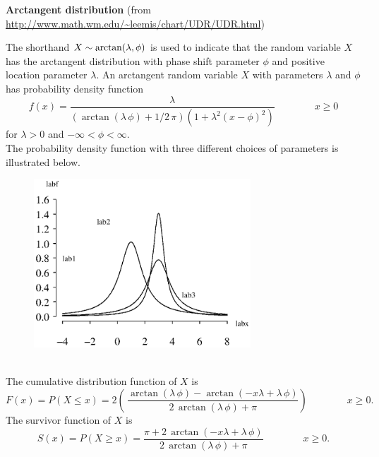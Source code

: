 \documentclass[12pt,fullpage]{article}
\begin{document}
\noindent
{\bf Arctangent distribution} (from \color{blue}\url{http://www.math.wm.edu/~leemis/chart/UDR/UDR.html}\color{black})

\noindent
The shorthand $X \sim {\rm arctan}(\lambda, \phi)$ is used to indicate that the
random variable $X$ has the arctangent distribution with phase shift parameter $\phi$ and positive location parameter $\lambda$.
An arctangent random variable $X$ with parameters $\lambda$ and $\phi$ has probability density function 
$$
f(x) = {\frac {\lambda } { \left( \arctan \left( \lambda \,\phi  \right) + 1 / 2 \,\pi  \right)  \left( 1 + {\lambda } ^ {2} \left( x - \phi  \right) ^ {2} \right) }}\qquad \qquad x \geq 0
$$
for
$\lambda > 0$
and
$-\infty < \phi < \infty$.\\
The probability density function with three different choices of parameters is illustrated below.
{\begin{figure}[h!]
\begin{center}
\includegraphics[width=3.2in]{ArctangentPlot.ps}
\end{center}
\end{figure}}\\
The cumulative distribution function of $X$ is
$$
F(x) = P(X \le x) = 2 \left( \, {\frac {\arctan \left( \lambda \, \phi  \right) - \arctan \left( -x \lambda + \lambda \, \phi  \right) } {2 \, \arctan \left( \lambda \, \phi  \right) + \pi }} \right) \qquad \qquad x \geq 0.
$$
The survivor function of $X$ is
$$
S(x) = P(X \ge x) = {\frac {\pi + 2 \, \arctan \left( -x\lambda + \lambda \,\phi  \right) }{2 \, \arctan \left( \lambda \, \phi  \right) + \pi }} \qquad \qquad x \geq 0.
$$
\end{document}
